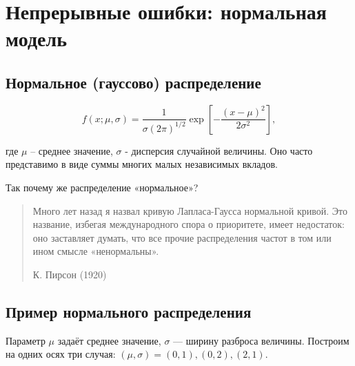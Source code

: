 \documentclass[
  russian,
  12pt,
  a4paper,
  a4paper,
  openany]{scrbook}
\begin{document}
\section{Непрерывные ошибки: нормальная
модель}\label{ux43dux435ux43fux440ux435ux440ux44bux432ux43dux44bux435-ux43eux448ux438ux431ux43aux438-ux43dux43eux440ux43cux430ux43bux44cux43dux430ux44f-ux43cux43eux434ux435ux43bux44c}

\begin{booknote}

\subsection{Нормальное (гауссово)
распределение}\label{ux43dux43eux440ux43cux430ux43bux44cux43dux43eux435-ux433ux430ux443ux441ux441ux43eux432ux43e-ux440ux430ux441ux43fux440ux435ux434ux435ux43bux435ux43dux438ux435}

\[f(x;\mu,\sigma)=\frac{1}{\sigma (2\pi)^{1/2}}\exp\left[-\frac{(x-\mu)^2}{2\sigma^2}\right],\]

где \(\mu\) -- среднее значение, \(\sigma\) - дисперсия случайной
величины. Оно часто представимо в виде суммы многих малых независимых
вкладов.

\end{booknote}

Так почему же распределение «нормальное»?

\begin{quote}
Много лет назад я назвал кривую Лапласа-Гаусса нормальной кривой. Это
название, избегая международного спора о приоритете, имеет недостаток:
оно заставляет думать, что все прочие распределения частот в том или
ином смысле «ненормальны».

К. Пирсон (1920)
\end{quote}

\subsection{Пример нормального
распределения}\label{ux43fux440ux438ux43cux435ux440-ux43dux43eux440ux43cux430ux43bux44cux43dux43eux433ux43e-ux440ux430ux441ux43fux440ux435ux434ux435ux43bux435ux43dux438ux44f}

Параметр \(\mu\) задаёт среднее значение, \(\sigma\) --- ширину разброса
величины. Построим на одних осях три случая:
\((\mu,\sigma)=(0,1),(0,2),(2,1)\).
\end{document}
